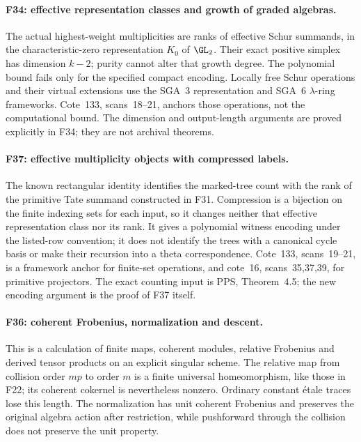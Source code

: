 \documentclass[11pt,a4paper]{article}
\newcommand{\fid}[1]{\textsf{#1}}\newcommand{\gate}[1]{\textsf{#1}}
\theoremstyle{named}\newtheorem{finding}{Finding}[section]
\theoremstyle{definition}\newtheorem{definition}[finding]{Definition}
\theoremstyle{remark}\newtheorem{remark}[finding]{Remark}
\begin{document}
\paragraph{\fid{F34}: effective representation classes and growth of graded algebras.}
The actual highest-weight multiplicities are ranks of effective Schur
summands, in the characteristic-zero representation $K_0$ of $\GL_2$.
Their exact positive simplex has dimension $k-2$; purity cannot alter
that growth degree. The polynomial bound fails only for the specified
compact encoding. Locally free Schur operations and their virtual
extensions use the SGA~3 representation and SGA~6 $\lambda$-ring
frameworks. Cote~133, scans~18--21, anchors those operations, not the
computational bound. The dimension and output-length arguments are
proved explicitly in \fid{F34}; they are not archival theorems.

\paragraph{\fid{F37}: effective multiplicity objects with compressed labels.}
The known rectangular identity identifies the marked-tree count with
the rank of the primitive Tate summand constructed in \fid{F31}.
Compression is a bijection on the finite indexing sets for each input,
so it changes neither that effective representation class nor its rank.
It gives a polynomial witness encoding under the listed-row convention;
it does not identify the trees with a canonical cycle basis or make their
recursion into a theta correspondence. Cote~133, scans~19--21, is a
framework anchor for finite-set operations, and cote~16, scans~35,37,39,
for primitive projectors. The exact counting input is PPS, Theorem~4.5;
the new encoding argument is the proof of \fid{F37} itself.



\paragraph{\fid{F36}: coherent Frobenius, normalization and descent.}

This is a calculation of finite maps, coherent modules, relative
Frobenius and derived tensor products on an explicit singular scheme.
The relative map from collision order $mp$ to order $m$ is a finite
universal homeomorphism, like those in \fid{F22}; its coherent cokernel
is nevertheless nonzero. Ordinary constant \'etale traces lose this
length. The normalization has unit coherent Frobenius and preserves
the original algebra action after restriction, while pushforward
through the collision does not preserve the unit property.
\end{document}
